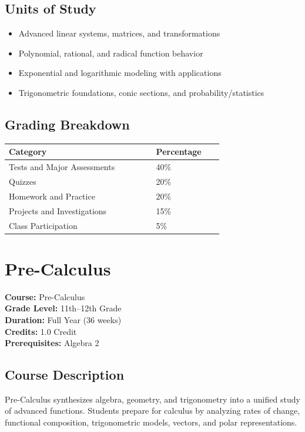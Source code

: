 \documentclass[12pt,oneside]{book}
\begin{document}
\section{Units of Study}
\begin{itemize}[leftmargin=2em]
    \item Advanced linear systems, matrices, and transformations
    \item Polynomial, rational, and radical function behavior
    \item Exponential and logarithmic modeling with applications
    \item Trigonometric foundations, conic sections, and probability/statistics
\end{itemize}

\section{Grading Breakdown}
\begin{center}
\begin{tabular}{L{0.55\linewidth}L{0.25\linewidth}}
\toprule
\textbf{Category} & \textbf{Percentage} \\
\midrule
Tests and Major Assessments & 40\% \\
Quizzes & 20\% \\
Homework and Practice & 20\% \\
Projects and Investigations & 15\% \\
Class Participation & 5\% \\
\bottomrule
\end{tabular}
\end{center}

\chapter{Pre-Calculus}

\noindent\textbf{Course:} Pre-Calculus\\
\textbf{Grade Level:} 11th--12th Grade\\
\textbf{Duration:} Full Year (36 weeks)\\
\textbf{Credits:} 1.0 Credit\\
\textbf{Prerequisites:} Algebra 2

\section{Course Description}
Pre-Calculus synthesizes algebra, geometry, and trigonometry into a unified study of advanced functions.
Students prepare for calculus by analyzing rates of change, functional composition, trigonometric models,
vectors, and polar representations.
\end{document}
